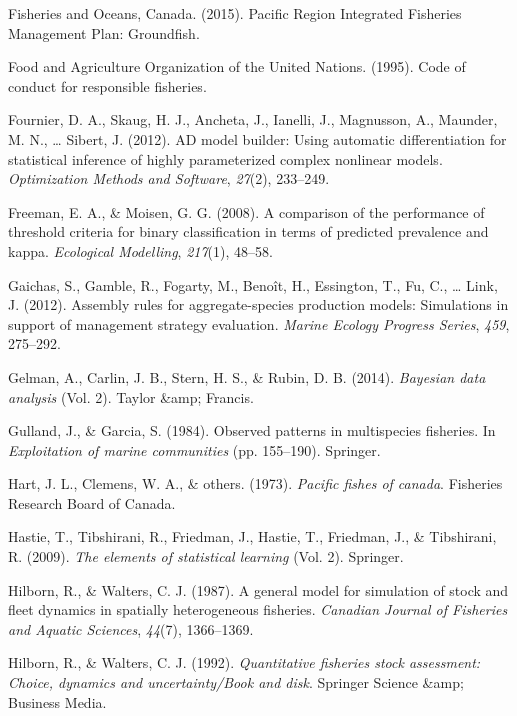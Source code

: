 \documentclass[12pt,]{scrartcl}
\begin{document}
\hypertarget{ref-PRIFMP2015}{}
Fisheries and Oceans, Canada. (2015). Pacific Region Integrated
Fisheries Management Plan: Groundfish.

\hypertarget{ref-FAO1995}{}
Food and Agriculture Organization of the United Nations. (1995). Code of
conduct for responsible fisheries.

\hypertarget{ref-fournier2012ad}{}
Fournier, D. A., Skaug, H. J., Ancheta, J., Ianelli, J., Magnusson, A.,
Maunder, M. N., \ldots{} Sibert, J. (2012). AD model builder: Using
automatic differentiation for statistical inference of highly
parameterized complex nonlinear models. \emph{Optimization Methods and
Software}, \emph{27}(2), 233--249.

\hypertarget{ref-freeman2008comparison}{}
Freeman, E. A., \& Moisen, G. G. (2008). A comparison of the performance
of threshold criteria for binary classification in terms of predicted
prevalence and kappa. \emph{Ecological Modelling}, \emph{217}(1),
48--58.

\hypertarget{ref-gaichas2012assembly}{}
Gaichas, S., Gamble, R., Fogarty, M., Benoît, H., Essington, T., Fu, C.,
\ldots{} Link, J. (2012). Assembly rules for aggregate-species
production models: Simulations in support of management strategy
evaluation. \emph{Marine Ecology Progress Series}, \emph{459}, 275--292.

\hypertarget{ref-gelman2014bayesian}{}
Gelman, A., Carlin, J. B., Stern, H. S., \& Rubin, D. B. (2014).
\emph{Bayesian data analysis} (Vol. 2). Taylor \&amp; Francis.

\hypertarget{ref-gulland1984observed}{}
Gulland, J., \& Garcia, S. (1984). Observed patterns in multispecies
fisheries. In \emph{Exploitation of marine communities} (pp. 155--190).
Springer.

\hypertarget{ref-hart1973pacific}{}
Hart, J. L., Clemens, W. A., \& others. (1973). \emph{Pacific fishes of
canada}. Fisheries Research Board of Canada.

\hypertarget{ref-hastie2009elements}{}
Hastie, T., Tibshirani, R., Friedman, J., Hastie, T., Friedman, J., \&
Tibshirani, R. (2009). \emph{The elements of statistical learning} (Vol.
2). Springer.

\hypertarget{ref-hilborn1987general}{}
Hilborn, R., \& Walters, C. J. (1987). A general model for simulation of
stock and fleet dynamics in spatially heterogeneous fisheries.
\emph{Canadian Journal of Fisheries and Aquatic Sciences}, \emph{44}(7),
1366--1369.

\hypertarget{ref-hilborn1992quantitative}{}
Hilborn, R., \& Walters, C. J. (1992). \emph{Quantitative fisheries
stock assessment: Choice, dynamics and uncertainty/Book and disk}.
Springer Science \&amp; Business Media.
\end{document}
